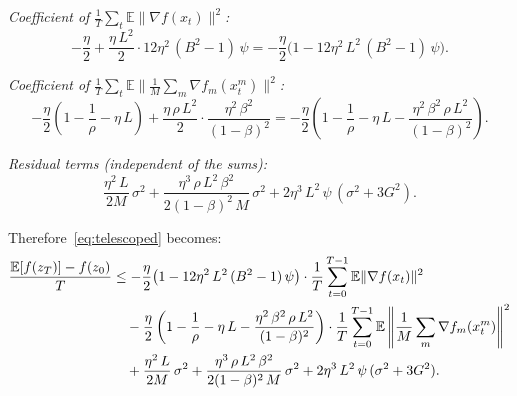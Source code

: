 \documentclass{article}
\begin{document}
\medskip
\noindent\emph{Coefficient of $\frac{1}{T}\sum_t\mathbb{E}\|\nabla f(x_t)\|^2$:}
\begin{equation}
-\frac{\eta}{2} + \frac{\eta\,L^2}{2}\cdot 12\eta^2\,(B^2-1)\,\psi
= -\frac{\eta}{2}\bigl(1 - 12\eta^2\,L^2\,(B^2-1)\,\psi\bigr).
\label{eq:coeff_grad}
\end{equation}

\noindent\emph{Coefficient of $\frac{1}{T}\sum_t\mathbb{E}\|\frac{1}{M}\sum_m\nabla f_m(x_t^m)\|^2$:}
\begin{equation}
-\frac{\eta}{2}\left(1 - \frac{1}{\rho} - \eta\,L\right)
+ \frac{\eta\,\rho\,L^2}{2}\cdot\frac{\eta^2\,\beta^2}{(1-\beta)^2}
= -\frac{\eta}{2}\left(1 - \frac{1}{\rho} - \eta\,L
  - \frac{\eta^2\,\beta^2\,\rho\,L^2}{(1-\beta)^2}\right).
\label{eq:coeff_hetero}
\end{equation}

\noindent\emph{Residual terms (independent of the sums):}
\begin{equation}
\frac{\eta^2\,L}{2M}\,\sigma^2
+ \frac{\eta^3\,\rho\,L^2\,\beta^2}{2(1-\beta)^2\,M}\,\sigma^2
+ 2\eta^3\,L^2\,\psi\,(\sigma^2 + 3G^2).
\label{eq:residual}
\end{equation}

Therefore~\eqref{eq:telescoped} becomes:
\begin{align}
\frac{\mathbb{E}[f(z_T)] - f(z_0)}{T}
&\leq -\frac{\eta}{2}\bigl(1 - 12\eta^2\,L^2\,(B^2-1)\,\psi\bigr)
    \cdot\frac{1}{T}\sum_{t=0}^{T-1}\mathbb{E}\|\nabla f(x_t)\|^2
    \notag \\
&\quad- \frac{\eta}{2}\left(1 - \frac{1}{\rho} - \eta\,L
  - \frac{\eta^2\,\beta^2\,\rho\,L^2}{(1-\beta)^2}\right)
    \cdot\frac{1}{T}\sum_{t=0}^{T-1}\mathbb{E}\left\|\frac{1}{M}\sum_m
    \nabla f_m(x_t^m)\right\|^2 \notag \\
&\quad+ \frac{\eta^2\,L}{2M}\,\sigma^2
  + \frac{\eta^3\,\rho\,L^2\,\beta^2}{2(1-\beta)^2\,M}\,\sigma^2
  + 2\eta^3\,L^2\,\psi\,(\sigma^2 + 3G^2).
\label{eq:step4_assembled}
\end{align}
\end{document}
